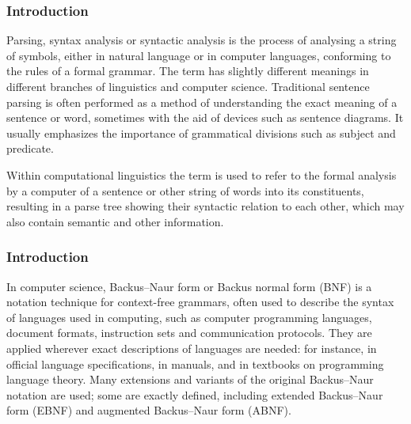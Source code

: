 \begin{frame}
    \frametitle{Introduction}
    \begin{minipage}{\textwidth}
        Parsing, syntax analysis or syntactic analysis is the process of analysing a string of symbols, either in natural language or in computer languages, conforming to the rules of a formal grammar. 
        The term has slightly different meanings in different branches of linguistics and computer science. Traditional sentence parsing is often performed as a method of understanding the exact meaning of a sentence or word, sometimes with the aid of devices such as sentence diagrams. It usually emphasizes the importance of grammatical divisions such as subject and predicate.

        Within computational linguistics the term is used to refer to the formal analysis by a computer of a sentence or other string of words into its constituents, resulting in a parse tree showing their syntactic relation to each other, which may also contain semantic and other information.
    \end{minipage}
\end{frame}

\begin{frame}
    \frametitle{Introduction}
    \begin{minipage}{\textwidth}
        In computer science, Backus–Naur form or Backus normal form (BNF) is a notation technique for context-free grammars, often used to describe the syntax of languages used in computing, such as computer programming languages, document formats, instruction sets and communication protocols. They are applied wherever exact descriptions of languages are needed: for instance, in official language specifications, in manuals, and in textbooks on programming language theory.
        Many extensions and variants of the original Backus–Naur notation are used; some are exactly defined, including extended Backus–Naur form (EBNF) and augmented Backus–Naur form (ABNF).
    \end{minipage}
\end{frame}
